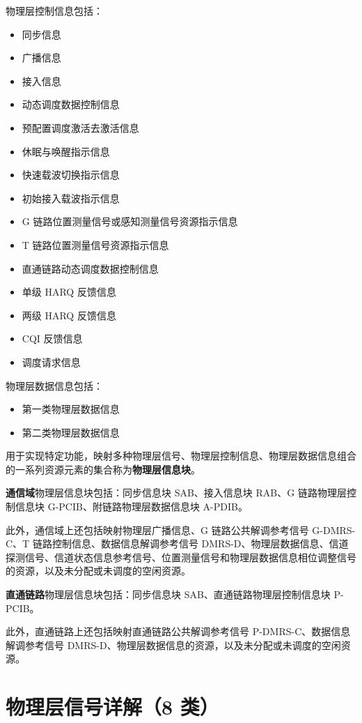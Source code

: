 \documentclass[11pt,a4paper]{ctexart}
\begin{document}
物理层控制信息包括：
\begin{itemize}[nosep]
  \item 同步信息
  \item 广播信息
  \item 接入信息
  \item 动态调度数据控制信息
  \item 预配置调度激活去激活信息
  \item 休眠与唤醒指示信息
  \item 快速载波切换指示信息
  \item 初始接入载波指示信息
  \item G 链路位置测量信号或感知测量信号资源指示信息
  \item T 链路位置测量信号资源指示信息
  \item 直通链路动态调度数据控制信息
  \item 单级 HARQ 反馈信息
  \item 两级 HARQ 反馈信息
  \item CQI 反馈信息
  \item 调度请求信息
\end{itemize}

物理层数据信息包括：
\begin{itemize}[nosep]
  \item 第一类物理层数据信息
  \item 第二类物理层数据信息
\end{itemize}

用于实现特定功能，映射多种物理层信号、物理层控制信息、物理层数据信息组合的一系列资源元素的集合称为\textbf{物理层信息块}。

\textbf{通信域}物理层信息块包括：同步信息块 SAB、接入信息块 RAB、G 链路物理层控制信息块 G-PCIB、附链路物理层数据信息块 A-PDIB。

此外，通信域上还包括映射物理层广播信息、G 链路公共解调参考信号 G-DMRS-C、T 链路控制信息、数据信息解调参考信号 DMRS-D、物理层数据信息、信道探测信号、信道状态信息参考信号、位置测量信号和物理层数据信息相位调整信号的资源，以及未分配或未调度的空闲资源。

\textbf{直通链路}物理层信息块包括：同步信息块 SAB、直通链路物理层控制信息块 P-PCIB。

此外，直通链路上还包括映射直通链路公共解调参考信号 P-DMRS-C、数据信息解调参考信号 DMRS-D、物理层数据信息的资源，以及未分配或未调度的空闲资源。

\section{物理层信号详解（8 类）}
\end{document}
